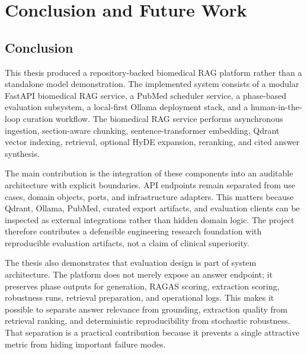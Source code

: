 \chapter{Conclusion and Future Work}

\section{Conclusion}

This thesis produced a repository-backed biomedical RAG platform rather than a standalone model demonstration. The implemented system consists of a modular FastAPI biomedical RAG service, a PubMed scheduler service, a phase-based evaluation subsystem, a local-first Ollama deployment stack, and a human-in-the-loop curation workflow. The biomedical RAG service performs asynchronous ingestion, section-aware chunking, sentence-transformer embedding, Qdrant vector indexing, retrieval, optional HyDE expansion, reranking, and cited answer synthesis.

The main contribution is the integration of these components into an auditable architecture with explicit boundaries. API endpoints remain separated from use cases, domain objects, ports, and infrastructure adapters. This matters because Qdrant, Ollama, PubMed, curated export artifacts, and evaluation clients can be inspected as external integrations rather than hidden domain logic. The project therefore contributes a defensible engineering research foundation with reproducible evaluation artifacts, not a claim of clinical superiority.

The thesis also demonstrates that evaluation design is part of system architecture. The platform does not merely expose an answer endpoint; it preserves phase outputs for generation, RAGAS scoring, extraction scoring, robustness runs, retrieval preparation, and operational logs. This makes it possible to separate answer relevance from grounding, extraction quality from retrieval ranking, and deterministic reproducibility from stochastic robustness. That separation is a practical contribution because it prevents a single attractive metric from hiding important failure modes.

